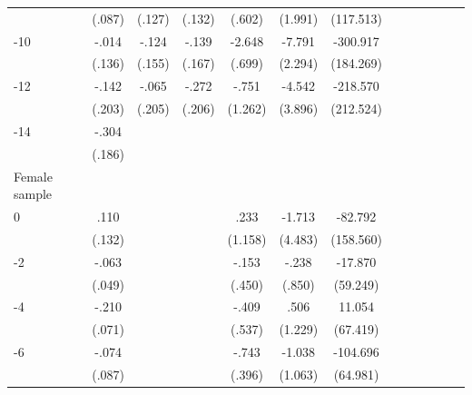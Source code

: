 \begin{table}[p]
\begin{adjustbox}{max width=\linewidth}
\begin{threeparttable}
{\begin{tabular}{l*{6}{S
S}}
                &   (.087)         &   (.127)         &   (.132)         &   (.602)         &  (1.991)         &(117.513)         \\
-10            &    -.014         &    -.124         &    -.139         &   -2.648\sym{***}&   -7.791\sym{***}& -300.917         \\
                &   (.136)         &   (.155)         &   (.167)         &   (.699)         &  (2.294)         &(184.269)         \\
-12           &    -.142         &    -.065         &    -.272         &    -.751         &   -4.542         & -218.570         \\
                &   (.203)         &   (.205)         &   (.206)         &  (1.262)         &  (3.896)         &(212.524)         \\
-14           &    -.304         &                  &                  &                  &                  &                  \\
                &   (.186)         &                  &                  &                  &                  &                  \\
\midrule
Female sample &&&&&&\\
0               &     .110         &         &         &     .233         &   -1.713         &  -82.792         \\
                &   (.132)         &         &         &  (1.158)         &  (4.483)         &(158.560)         \\
-2             &    -.063         &         &         &    -.153         &    -.238         &  -17.870         \\
                &   (.049)         &         &         &   (.450)         &   (.850)         & (59.249)         \\
-4             &    -.210\sym{***}&         &         &    -.409         &     .506         &   11.054         \\
                &   (.071)         &         &         &   (.537)         &  (1.229)         & (67.419)         \\
-6             &    -.074         &         &         &    -.743\sym{*}  &   -1.038         & -104.696         \\
                &   (.087)         &         &         &   (.396)         &  (1.063)         & (64.981)         \\

\end{tabular}}
\end{threeparttable}
\end{adjustbox}
\end{table}
